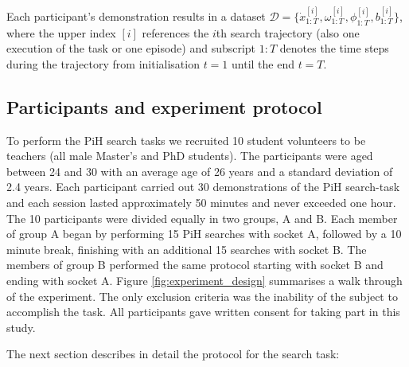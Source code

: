 
Each participant's demonstration results in a dataset ${\mathcal{D} =\{\dot{x}^{[i]}_{1:T},\omega^{[i]}_{1:T},\phi^{[i]}_{1:T},b^{[i]}_{1:T}\}}$, 
where the upper index $[i]$ references the $i$th search trajectory (also one execution of the task or one episode) and 
subscript $1:T$ denotes the time steps during the trajectory from initialisation $t=1$ until the end $t=T$. 

\subsection{Participants and experiment protocol}

To perform the PiH search tasks we recruited 10 student volunteers to be teachers (all male Master's and PhD students).
The participants were aged between 24 and 30 with an average age of 26 years and a standard deviation of 2.4 years.
Each participant carried out 30 demonstrations of the PiH search-task and each session lasted approximately 50 minutes and 
never exceeded one hour. The 10 participants were divided equally in two groups, A and B. Each member of group A began 
by performing 15 PiH searches with socket A, followed by a 10 minute break, finishing with an additional 15 searches with socket B. 
The members of group B performed the same protocol starting with socket B and ending with socket A.
Figure \ref{fig:experiment_design} summarises a walk through of the experiment.
The only exclusion criteria was the inability of the subject to accomplish the task. All participants gave written consent 
for taking part in this study.

The next section describes in detail the protocol for the search task:

